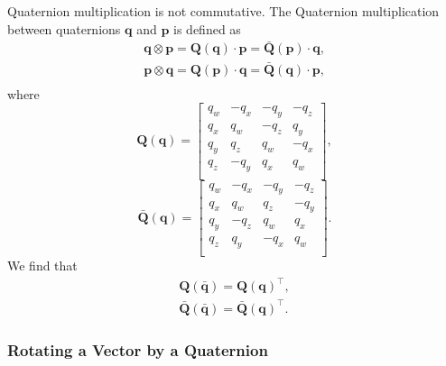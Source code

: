 \documentclass[10pt,a4paper,fleqn]{article}
\newcommand{\qx}[0]{\ensuremath{q_x}}
\newcommand{\qy}[0]{\ensuremath{q_y}}
\newcommand{\qz}[0]{\ensuremath{q_z}}
\newcommand{\qw}[0]{\ensuremath{q_w}}
\newcommand{\bVec}[1]{\mathbf{#1}}
\begin{document}
Quaternion multiplication is not commutative. 
The Quaternion multiplication between quaternions $\bVec{q}$ and $\bVec{p}$ is defined as
%
\begin{align}
\bVec{q} \otimes \bVec{p} = \bVec{Q}\left(\bVec{q}\right) \cdot \bVec{p} = \bar{\bVec{Q}}\left(\bVec{p}\right) \cdot \bVec{q},\\
%
\bVec{p} \otimes \bVec{q} = \bVec{Q}\left(\bVec{p}\right) \cdot \bVec{q} = \bar{\bVec{Q}}\left(\bVec{q}\right)\cdot \bVec{p},\\
\end{align}
%
where 
%
\begin{equation}
\bVec{Q}\left(\bVec{q}\right) = 
\begin{bmatrix} 
	\qw & -\qx & -\qy & -\qz \\ 
	\qx &  \qw & -\qz &  \qy \\
	\qy &  \qz &  \qw & -\qx \\
	\qz & -\qy &  \qx &  \qw \\
\end{bmatrix},
\end{equation}
%
\begin{equation}
\bar{\bVec{Q}}\left(\bVec{q}\right) = 
\begin{bmatrix} 
	\qw & -\qx & -\qy & -\qz \\ 
	\qx &  \qw &  \qz & -\qy \\
	\qy & -\qz &  \qw &  \qx \\
	\qz &  \qy & -\qx &  \qw \\
\end{bmatrix}.
\end{equation}
%
We find that
%
\begin{align}
\bVec{Q}\left(\bar{\bVec{q}}\right) = \bVec{Q}\left(\bVec{q}\right)^{\top},\\
\bar{\bVec{Q}}\left(\bar{\bVec{q}}\right) = \bar{\bVec{Q}}\left(\bVec{q}\right)^{\top}.
\end{align}

\subsubsection{Rotating a Vector by a Quaternion}
\end{document}
